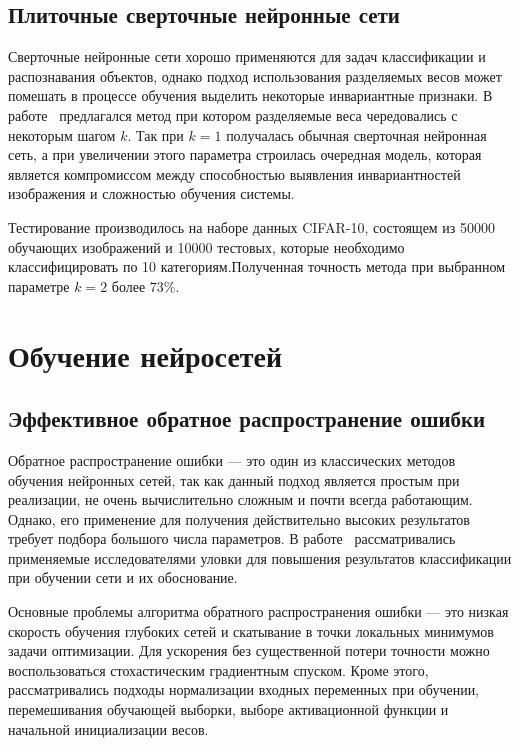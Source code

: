 \documentclass[a4paper,14pt]{extarticle} %
\begin{document}
\subsection{Плиточные сверточные нейронные сети}
\hspace{\parindent} Сверточные нейронные сети хорошо применяются для задач классификации и распознавания объектов, однако подход использования разделяемых весов может помешать в процессе обучения выделить некоторые инвариантные признаки. В работе~\cite{ngiam2010tiled} предлагался метод при котором разделяемые веса чередовались с некоторым шагом $k$. Так при $k=1$ получалась обычная сверточная нейронная сеть, а при увеличении этого параметра строилась очередная модель, которая является компромиссом между способностью выявления инвариантностей изображения и сложностью обучения системы.

Тестирование производилось на наборе данных CIFAR-10, состоящем из 50000 обучающих изображений и 10000 тестовых, которые необходимо классифицировать по 10 категориям.Полученная точность метода при выбранном параметре $k=2$ более 73\%.

\section{Обучение нейросетей}

\subsection{Эффективное обратное распространение ошибки}
\hspace{\parindent} Обратное распространение ошибки --- это один из классических методов обучения нейронных сетей, так как данный подход является простым при реализации, не очень вычислительно сложным и почти всегда работающим. Однако, его применение для получения действительно высоких результатов требует подбора большого числа параметров. В работе~\cite{lecun2012efficient} рассматривались применяемые исследователями уловки для повышения результатов классификации при обучении сети и их обоснование.

Основные проблемы алгоритма обратного распространения ошибки --- это низкая скорость обучения глубоких сетей и скатывание в точки локальных минимумов задачи оптимизации. Для ускорения без существенной потери точности можно воспользоваться стохастическим градиентным спуском. Кроме этого, рассматривались подходы нормализации входных переменных при обучении, перемешивания обучающей выборки, выборе активационной функции и начальной инициализации весов.
\end{document}
